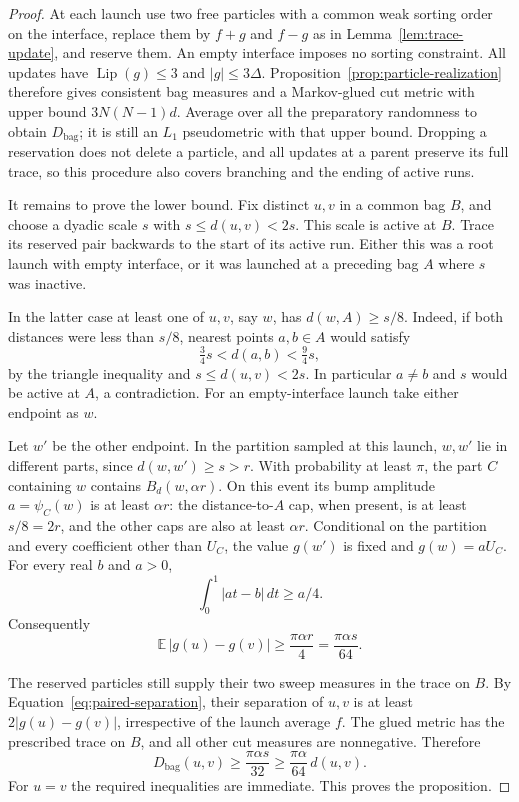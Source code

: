 \begin{proof}
At each launch use two free particles with a common weak sorting order on
the interface, replace them by $f+g$ and $f-g$ as in
Lemma~\ref{lem:trace-update}, and reserve them. An empty interface
imposes no sorting constraint. All updates have
$\operatorname{Lip}(g)\leq3$ and $|g|\leq3\Delta$.
Proposition~\ref{prop:particle-realization} therefore gives consistent
bag measures and a Markov-glued cut metric with upper bound
$3N(N-1)d$. Average over all the preparatory randomness to obtain
$D_{\mathrm{bag}}$; it is still an $L_1$ pseudometric with that upper
bound. Dropping a reservation does not delete a particle, and all updates
at a parent preserve its full trace, so this procedure also covers
branching and the ending of active runs.

It remains to prove the lower bound. Fix distinct $u,v$ in a common bag
$B$, and choose a dyadic scale $s$ with $s\leq d(u,v)<2s$.
This scale is active at $B$. Trace its reserved pair backwards to the
start of its active run. Either this was a root launch with empty
interface, or it was launched at a preceding bag $A$ where $s$ was
inactive.

In the latter case at least one of $u,v$, say $w$, has
$d(w,A)\geq s/8$. Indeed, if both distances were less than $s/8$,
nearest points $a,b\in A$ would satisfy
\[
  \tfrac34s<d(a,b)<\tfrac94s,
\]
by the triangle inequality and $s\leq d(u,v)<2s$.
In particular $a\ne b$ and $s$ would be active at $A$, a contradiction.
For an empty-interface launch take either endpoint as $w$.

Let $w'$ be the other endpoint. In the partition sampled at this launch,
$w,w'$ lie in different parts, since $d(w,w')\geq s>r$.
With probability at least $\pi$, the part $C$ containing $w$ contains
$B_d(w,\alpha r)$. On this event its bump amplitude
$a=\psi_C(w)$ is at least $\alpha r$: the distance-to-$A$ cap, when
present, is at least $s/8=2r$, and the other caps are also at least
$\alpha r$. Conditional on the partition and every coefficient other
than $U_C$, the value $g(w')$ is fixed and $g(w)=aU_C$. For every real
$b$ and $a>0$,
\[
  \int_0^1|at-b|\,dt\geq a/4.
\]
Consequently
\[
  \mathbb E\,|g(u)-g(v)|\geq\frac{\pi\alpha r}{4}
      =\frac{\pi\alpha s}{64}.
\]

The reserved particles still supply their two sweep measures in the trace
on $B$. By Equation~\eqref{eq:paired-separation}, their separation of $u,v$ is at least
$2|g(u)-g(v)|$, irrespective of the launch average $f$.
The glued metric has the prescribed trace on $B$, and all other cut
measures are nonnegative. Therefore
\[
  D_{\mathrm{bag}}(u,v)
    \geq\frac{\pi\alpha s}{32}
    \geq\frac{\pi\alpha}{64}\,d(u,v).
\]
For $u=v$ the required inequalities are immediate. This proves the
proposition.
\end{proof}
